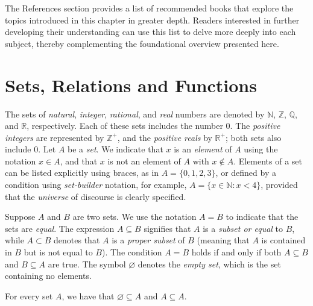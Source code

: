 The References section provides a list of recommended books that explore the topics introduced in this chapter in greater depth. Readers interested in further developing their understanding can use this list to delve more deeply into each subject, thereby complementing the foundational overview presented here.

%
%

\section{Sets, Relations and Functions}
\label{sec:sets}

The sets of \emph{natural}, \emph{integer}, \emph{rational}, and \emph{real} numbers are denoted by $\mathbb{N}$, $\mathbb{Z}$, $\mathbb{Q}$, and $\mathbb{R}$, respectively. Each of these sets includes the number $0$. The \emph{positive integers} are represented by $\mathbb{Z}^+$, and the \emph{positive reals} by $\mathbb{R}^+$; both sets also include $0$. Let $A$ be a \emph{set}. We indicate that $x$ is an \emph{element} of $A$ using the notation $x \in A$, and that $x$ is not an element of $A$ with $x \notin A$. Elements of a set can be listed explicitly using braces, as in $A = \{0, 1, 2, 3\}$, or defined by a condition using \emph{set-builder} notation, for example, $A = \{x \in \mathbb{N} : x < 4\}$, provided that the \emph{universe} of discourse is clearly specified.

Suppose $A$ and $B$ are two sets. We use the notation $A = B$ to indicate that the sets are \emph{equal}. The expression $A \subseteq B$ signifies that $A$ is a \emph{subset or equal} to $B$, while $A \subset B$ denotes that $A$ is a \emph{proper subset} of $B$ (meaning that $A$ is contained in $B$ but is not equal to $B$). The condition $A = B$ holds if and only if both $A \subseteq B$ and $B \subseteq A$ are true. The symbol $\varnothing$ denotes the \emph{empty set}, which is the set containing no elements.

\begin{example}
For every set $A$, we have that $\varnothing \subseteq A$ and $A \subseteq A$.
\end{example}


